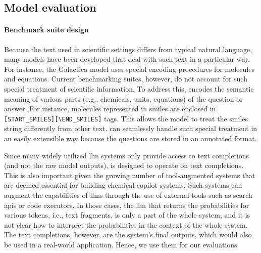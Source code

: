 \documentclass[11pt, oneside]{article}
\begin{document}
\begin{refsegment}
\subsection{Model evaluation}

\paragraph{Benchmark suite design} Because the text used in scientific settings differs from typical natural language, many models have been developed that deal with such text in a particular way.
For instance, the Galactica model\autocite{taylor2022galactica} uses special encoding procedures for molecules and equations.
Current benchmarking suites, however, do not account for such special treatment of scientific information.
To address this, \chembench encodes the semantic meaning of various parts (e.g., chemicals, units, equations) of the question or answer.
For instance, molecules represented in \gls{smiles} are enclosed in \texttt{[START\_SMILES][\textbackslash END\_SMILES]} tags.
This allows the model to treat the \gls{smiles} string differently from other text.
\chembench can seamlessly handle such special treatment in an easily extensible way because the questions are stored in an annotated format.

Since many widely utilized \gls{llm} systems only provide access to text completions (and not the raw model outputs), \chembench is designed to operate on text completions.
This is also important given the growing number of tool-augmented systems that are deemed essential for building chemical copilot systems.
Such systems can augment the capabilities of \glspl{llm} through the use of external tools such as search \glspl{api} or code executors.\autocite{schick2024toolformer, karpas2022mrkl, yao2022react}
In those cases, the \gls{llm} that returns the probabilities for various tokens, i.e., text fragments, is only a part of the whole system, and it is not clear how to interpret the probabilities in the context of the whole system.
The text completions, however, are the system's final outputs, which would also be used in a real-world application.
Hence, we use them for our evaluations.\autocite{xiong2023llms}


\end{refsegment}
\end{document}
